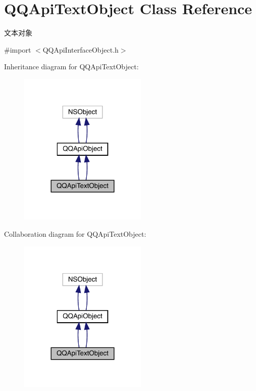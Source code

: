 \hypertarget{interface_q_q_api_text_object}{}\section{Q\+Q\+Api\+Text\+Object Class Reference}
\label{interface_q_q_api_text_object}


文本对象  




{\ttfamily \#import $<$Q\+Q\+Api\+Interface\+Object.\+h$>$}



Inheritance diagram for Q\+Q\+Api\+Text\+Object\+:\nopagebreak
\begin{figure}[H]
\begin{center}
\leavevmode
\includegraphics[width=173pt]{interface_q_q_api_text_object__inherit__graph}
\end{center}
\end{figure}


Collaboration diagram for Q\+Q\+Api\+Text\+Object\+:\nopagebreak
\begin{figure}[H]
\begin{center}
\leavevmode
\includegraphics[width=173pt]{interface_q_q_api_text_object__coll__graph}
\end{center}
\end{figure}
